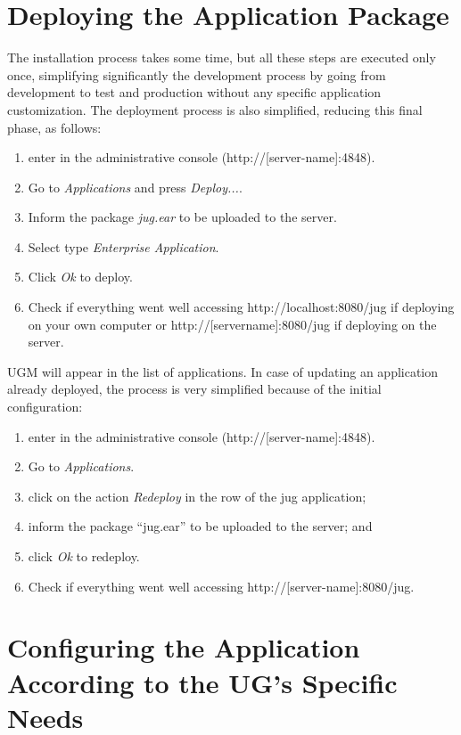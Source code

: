 \documentclass[envcountsame,envcountchap]{svmono}
\begin{document}
\section{Deploying the Application Package}

The installation process takes some time, but all these steps are executed only once, simplifying significantly the development process by going from development to test and production without any specific application customization. The deployment process is also simplified, reducing this final phase, as follows:

\begin{enumerate}
\item enter in the administrative console (http://[server-name]:4848).
\item Go to \textit{Applications} and press \textit{Deploy...}.
\item Inform the package \textit{jug.ear} to be uploaded to the server.
\item Select type \textit{Enterprise Application}.
\item Click \textit{Ok} to deploy.
\item Check if everything went well accessing http://localhost:8080/jug if deploying on your own computer or http://[servername]:8080/jug if deploying on the server.
\end{enumerate}

UGM will appear in the list of applications. In case of updating an application already deployed, the process is very simplified because of the initial configuration:

\begin{enumerate}
\item enter in the administrative console (http://[server-name]:4848).
\item Go to \textit{Applications}.
\item click on the action \textit{Redeploy} in the row of the jug application;
\item inform the package “jug.ear” to be uploaded to the server; and
\item click \textit{Ok} to redeploy.
\item Check if everything went well accessing http://[server-name]:8080/jug.
\end{enumerate}

\section{Configuring the Application According to the UG's Specific Needs}
\end{document}
